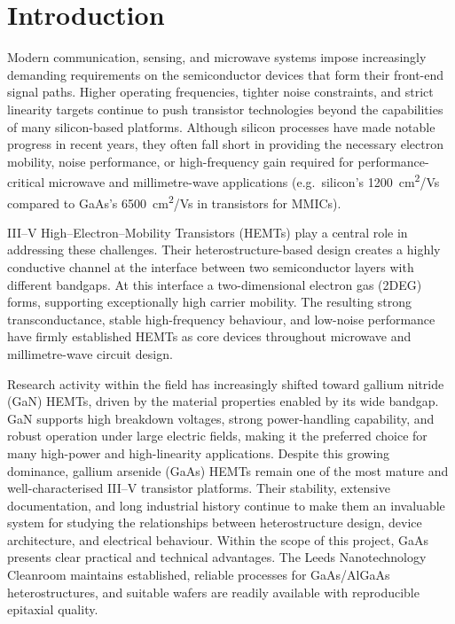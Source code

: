 \chapter{Introduction}
\label{ch:introduction}

Modern communication, sensing, and microwave systems impose increasingly
demanding requirements on the semiconductor devices that form their
front-end signal paths. Higher operating frequencies, tighter noise
constraints, and strict linearity targets continue to push transistor
technologies beyond the capabilities of many silicon-based platforms.
\cite{chaturvedi2021} Although silicon processes have made notable progress
in recent years, they often fall short in providing the necessary electron
mobility, noise performance, or high-frequency gain required for
performance-critical microwave and millimetre-wave applications
(e.g.\ silicon's 1200~cm\textsuperscript{2}/Vs compared to GaAs's
6500~cm\textsuperscript{2}/Vs in transistors for MMICs). \cite{chaturvedi2021}

III--V High--Electron--Mobility Transistors (HEMTs) play a central role in
addressing these challenges. Their heterostructure-based design creates a
highly conductive channel at the interface between two semiconductor layers
with different bandgaps. At this interface a two-dimensional electron gas
(2DEG) forms, supporting exceptionally high carrier mobility. The resulting
strong transconductance, stable high-frequency behaviour, and low-noise
performance have firmly established HEMTs as core devices throughout
microwave and millimetre-wave circuit design. \cite{mishra2002}

Research activity within the field has increasingly shifted toward gallium
nitride (GaN) HEMTs, driven by the material properties enabled by its wide
bandgap. GaN supports high breakdown voltages, strong power-handling
capability, and robust operation under large electric fields, making it the
preferred choice for many high-power and high-linearity applications.
\cite{Mishra2008} Despite this growing dominance, gallium arsenide (GaAs)
HEMTs remain one of the most mature and well-characterised III--V transistor
platforms. Their stability, extensive documentation, and long industrial
history continue to make them an invaluable system for studying the
relationships between heterostructure design, device architecture, and
electrical behaviour. \cite{Mimura2002,Mimura1980} Within the scope of this project, 
GaAs presents clear practical and technical advantages. 
The Leeds Nanotechnology Cleanroom maintains established, reliable processes 
for GaAs/AlGaAs heterostructures, and suitable wafers are readily available 
with reproducible epitaxial quality. \cite{leedscleanroom}

